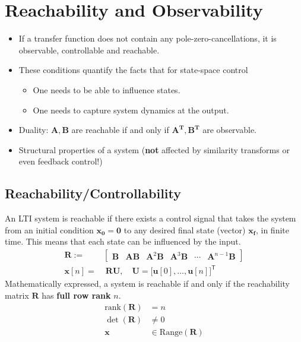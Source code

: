 \section{Reachability and Observability}
\begin{itemize}
    \item If a transfer function does not contain any pole-zero-cancellations, it is observable, controllable and reachable.
    \item These conditions quantify the facts that for state-space control
          \begin{itemize}
              \item One needs to be able to influence states.
              \item One needs to capture system dynamics at the output.
          \end{itemize}
    \item Duality: $\mathbf{A},\mathbf{B}$ are reachable if and only if $\mathbf{A^T}, \mathbf{B^T}$ are observable.
    \item Structural properties of a system (\textbf{not} affected by similarity transforms or even feedback control!)
\end{itemize}


\subsection{Reachability/Controllability}

An LTI system is reachable if there exists a control signal that takes the system from an initial condition $\mathbf{x_0} = \mathbf{0}$ to any desired final state (vector) $\mathbf{x_f}$, in finite time. This means that each state can be influenced by the input.
\noindent\begin{align*}
    \mathbf{R} :=   & \begin{bmatrix}
                          \mathbf{B} & \mathbf{AB} & \mathbf{A}^2\mathbf{B} & \mathbf{A}^3\mathbf{B} & \cdots & \mathbf{A}^{n-1}\mathbf{B}
                      \end{bmatrix} \\
    \mathbf{x}[n] = & \; \mathbf{RU},\quad \mathbf{U}={\bigl[\mathbf{u}[0],\ldots, \mathbf{u}[n]\bigr]}^{\mathsf{T}}
\end{align*}
Mathematically expressed, a system is reachable if and only if the reachability matrix $\mathbf{R}$ has \textbf{full row rank} $n$.
\begin{align*}
    \text{rank}(\mathbf{R}) & = n                            \\
    \det(\mathbf{R})        & \neq 0                         \\  %
    \mathbf{\mathbf{x}}     & \in \mathrm{Range}(\mathbf{R})
\end{align*}

